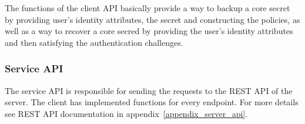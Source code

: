 The functions of the client API basically provide a way to
backup a core secret by providing user's identity attributes,
the secret and constructing the policies, as well as a way
to recover a core secred by providing the user's identity
attributes and then satisfying the authentication challenges.


\subsubsection{Service API}

The service API is responsible for sending the requests to the REST
API of the server. The client has implemented functions for every
endpoint.
For more details see REST API documentation in
appendix~\ref{appendix_server_api}.
